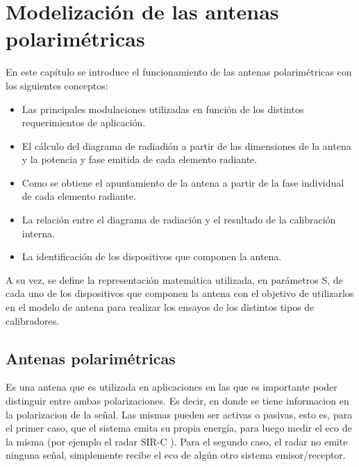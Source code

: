 
\chapter{Modelización de las antenas polarimétricas} %
\label{ch:phasedArray}

En este capítulo se introduce el funcionamiento de las antenas polarimétricas con los siguientes conceptos:
\begin{itemize}
	\item Las principales modulaciones utilizadas en función de los distintos requerimientos de aplicación.
	\item El cálculo del diagrama de radiadión a partir de las dimensiones de la antena y la potencia y fase emitida de cada 
		elemento radiante.
	\item Como se obtiene el apuntamiento de la antena a partir de la fase individual de cada elemento radiante. 
	\item La relación entre el diagrama de radiación y el resultado de la calibración interna. 
	\item La identificación de los dispositivos que componen la antena.
\end{itemize}

A su vez, se define la representación matemática utilizada, en parámetros S, de cada uno de los dispositivos que componen la 
antena con el objetivo de utilizarlos en el modelo de antena para realizar los ensayos de los distintos tipos de calibradores.


\section{Antenas polarimétricas}

Es una antena que es utilizada en aplicaciones en las que es importante poder distinguir entre ambas polarizaciones. Es decir, 
en donde se tiene informacion en la polarizacion de la señal. Las mismas pueden ser activas o pasivas, esto es, para el primer
caso, que el sistema emita su propia energía, para luego medir el eco de la misma (por ejemplo el radar SIR-C 
\cite{Curlander1991}). Para el segundo caso, el radar no emite ninguna señal, simplemente recibe el eco de algún otro sistema 
emisor/receptor.

